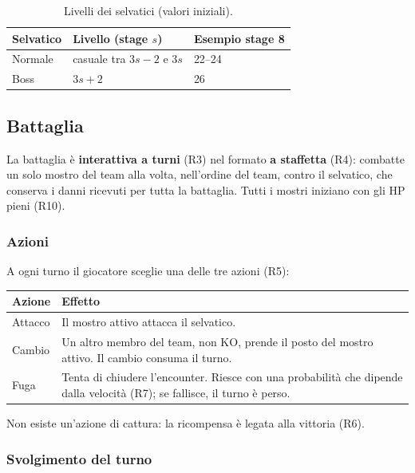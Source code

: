 \documentclass[11pt,a4paper]{article}
\begin{document}
\begin{table}[htbp]
  \centering
  \small
  \begin{tabular}{@{}lll@{}}
    \toprule
    Selvatico & Livello (stage $s$) & Esempio stage 8 \\
    \midrule
    Normale & casuale tra $3s-2$ e $3s$ & 22–24 \\
    Boss    & $3s+2$                    & 26 \\
    \bottomrule
  \end{tabular}
  \caption{Livelli dei selvatici (valori iniziali).}
\end{table}

\subsection{Battaglia}

La battaglia è \textbf{interattiva a turni} (R3) nel formato \textbf{a staffetta} (R4): combatte un solo mostro del team alla volta, nell'ordine del team, contro il selvatico, che conserva i danni ricevuti per tutta la battaglia. Tutti i mostri iniziano con gli HP pieni (R10).

\subsubsection*{Azioni}

A ogni turno il giocatore sceglie una delle tre azioni (R5):

\begin{tabularx}{\linewidth}{@{}L{2.6cm}Y@{}}
  \toprule
  Azione & Effetto \\
  \midrule
  Attacco & Il mostro attivo attacca il selvatico. \\
  Cambio  & Un altro membro del team, non KO, prende il posto del mostro attivo. Il cambio consuma il turno. \\
  Fuga    & Tenta di chiudere l'encounter. Riesce con una probabilità che dipende dalla velocità (R7); se fallisce, il turno è perso. \\
  \bottomrule
\end{tabularx}

Non esiste un'azione di cattura: la ricompensa è legata alla vittoria (R6).

\subsubsection*{Svolgimento del turno}
\end{document}
